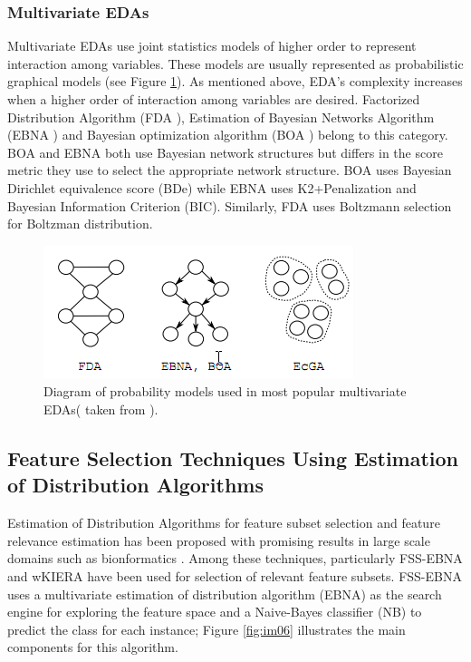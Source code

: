\subsubsection{Multivariate EDAs}
Multivariate EDAs use joint statistics models of higher order to represent interaction among variables. These models are usually represented as probabilistic graphical models (see Figure \ref{fig:im05}). As mentioned above, EDA's complexity increases when a higher order of interaction among variables are desired. Factorized Distribution Algorithm (FDA \cite{muhlen99}), Estimation of Bayesian Networks Algorithm (EBNA \cite{larranaga00}) and Bayesian optimization algorithm (BOA \cite{pelikan99}) belong to this category.  BOA and EBNA both use Bayesian network structures but differs in the score metric they use to select the appropriate network structure.  BOA uses Bayesian Dirichlet equivalence score (BDe) while EBNA uses K2+Penalization and Bayesian Information Criterion (BIC).  Similarly, FDA uses Boltzmann selection for Boltzman distribution.

\begin{figure}[ht]
	\centering
		\includegraphics{Images/medas.png}
	\caption[Diagram of probability models used in most popular multivariate EDAs.]%
	{Diagram of probability models used in most popular multivariate EDAs( taken from \cite{larranaga08}).}
	\label{fig:im05}
\end{figure}

 
\subsection{Feature Selection Techniques Using Estimation of Distribution Algorithms}
Estimation of Distribution Algorithms for feature subset selection and feature relevance estimation has been proposed with promising results in large scale domains such as bionformatics \cite{inza00,saeys03}. Among these techniques, particularly FSS-EBNA \cite{larranaga00FSS} and wKIERA\cite{rojas08} have been used for selection of relevant feature subsets.  
FSS-EBNA uses a multivariate estimation of distribution algorithm (EBNA) as the search engine for exploring the feature space and a Naive-Bayes classifier (NB) to predict the class for each instance; Figure \ref{fig:im06} illustrates the main components for this algorithm.

